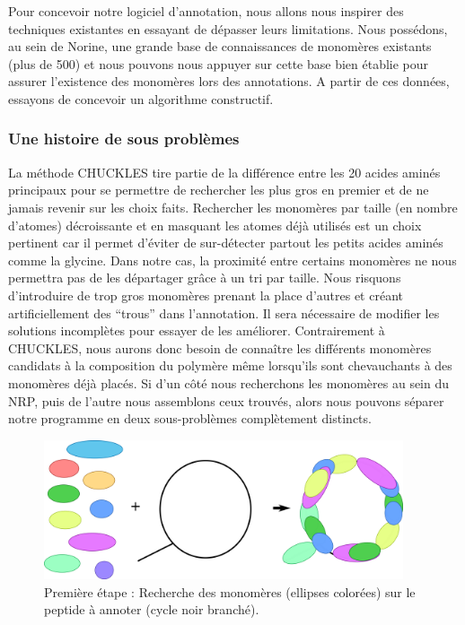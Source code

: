 Pour concevoir notre logiciel d'annotation, nous allons nous inspirer des techniques existantes en essayant de dépasser leurs limitations.
Nous possédons, au sein de Norine, une grande base de connaissances de monomères existants (plus de 500) et nous pouvons nous appuyer sur cette base bien établie pour assurer l'existence des monomères lors des annotations.
A partir de ces données, essayons de concevoir un algorithme constructif.


\subsubsection{Une histoire de sous problèmes}
\label{subproblems}

La méthode CHUCKLES tire partie de la différence entre les 20 acides aminés principaux pour se permettre de rechercher les plus gros en premier et de ne jamais revenir sur les choix faits.
Rechercher les monomères par taille (en nombre d'atomes) décroissante et en masquant les atomes déjà utilisés est un choix pertinent car il permet d'éviter de sur-détecter partout les petits acides aminés comme la glycine.
Dans notre cas, la proximité entre certains monomères ne nous permettra pas de les départager grâce à un tri par taille.
Nous risquons d'introduire de trop gros monomères prenant la place d'autres et créant artificiellement des ``trous'' dans l'annotation.
Il sera nécessaire de modifier les solutions incomplètes pour essayer de les améliorer.
Contrairement à CHUCKLES, nous aurons donc besoin de connaître les différents monomères candidats à la composition du polymère même lorsqu'ils sont chevauchants à des monomères déjà placés.
Si d'un côté nous recherchons les monomères au sein du NRP, puis de l'autre nous assemblons ceux trouvés, alors nous pouvons séparer notre programme en deux sous-problèmes complètement distincts.

\begin{figure}[!ht]
  \begin{center}
    \includegraphics[width=400px]{Figures/s2m/Intro/searching.png}
    \caption{\label{search_fig}Première étape : Recherche des monomères (ellipses colorées) sur le peptide à annoter (cycle noir branché).}
  \end{center}
\end{figure}

